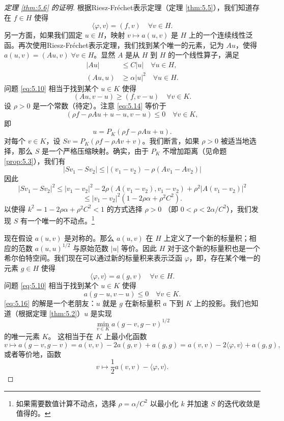 \begin{proof}[定理 \ref{thm:5.6} 的证明]
根据Riesz-Fréchet表示定理（定理 \ref{thm:5.5}），我们知道存在 $f \in H$ 使得
\[ \langle \varphi, v \rangle = (f,v) \quad \forall v \in H. \]
另一方面，如果我们固定 $u \in H$，映射 $v \mapsto a(u,v)$ 是 $H$ 上的一个连续线性泛函。再次使用Riesz-Fréchet表示定理，我们找到某个唯一的元素，记为 $Au$，使得 $a(u,v)=(Au,v) \; \forall v \in H$。显然 $A$ 是从 $H$ 到 $H$ 的一个线性算子，满足
\begin{align}
|Au| &\le C|u| \quad \forall u \in H, \label{eq:5.12} \\
(Au,u) &\ge \alpha|u|^2 \quad \forall u \in H. \label{eq:5.13}
\end{align}
问题 \eqref{eq:5.10} 相当于找到某个 $u \in K$ 使得
\begin{equation}\label{eq:5.14}
(Au, v-u) \ge (f, v-u) \quad \forall v \in K.
\end{equation}
设 $\rho > 0$ 是一个常数（待定）。注意 \eqref{eq:5.14} 等价于
\begin{equation}\label{eq:5.15}
(\rho f - \rho Au + u - u, v-u) \le 0 \quad \forall v \in K,
\end{equation}
即
\[ u = P_K(\rho f - \rho Au + u). \]
对每个 $v \in K$，设 $Sv = P_K(\rho f - \rho Av + v)$。我们断言，如果 $\rho > 0$ 被适当地选择，那么 $S$ 是一个严格压缩映射。确实，由于 $P_K$ 不增加距离（见命题 \ref{prop:5.3}），我们有
\[ |Sv_1 - Sv_2| \le |(v_1 - v_2) - \rho(Av_1 - Av_2)| \]
因此
\[ |Sv_1 - Sv_2|^2 \le |v_1-v_2|^2 - 2\rho(A(v_1-v_2), v_1-v_2) + \rho^2|A(v_1-v_2)|^2 \]
\[ \le |v_1-v_2|^2 (1-2\rho\alpha + \rho^2 C^2). \]
以使得 $k^2 = 1-2\rho\alpha + \rho^2 C^2 < 1$ 的方式选择 $\rho > 0$ （即 $0 < \rho < 2\alpha/C^2$），我们发现 $S$ 有一个唯一的不动点。\footnote{如果需要数值计算不动点，选择 $\rho = \alpha/C^2$ 以最小化 $k$ 并加速 $S$ 的迭代收敛是值得的。}

现在假设 $a(u,v)$ 是对称的。那么 $a(u,v)$ 在 $H$ 上定义了一个新的标量积；相应的范数 $a(u,u)^{1/2}$ 与原始范数 $|u|$ 等价。因此 $H$ 对于这个新的标量积也是一个希尔伯特空间。我们现在可以通过新的标量积来表示泛函 $\varphi$，即，存在某个唯一的元素 $g \in H$ 使得
\[ \langle \varphi, v \rangle = a(g,v) \quad \forall v \in H. \]
问题 \eqref{eq:5.10} 相当于找到某个 $u \in K$ 使得
\begin{equation}\label{eq:5.16}
a(g-u, v-u) \le 0 \quad \forall v \in K.
\end{equation}
\eqref{eq:5.16} 的解是一个老朋友：$u$ 就是 $g$ 在新标量积 $a$ 下到 $K$ 上的投影。我们也知道（根据定理 \ref{thm:5.2}）$u$ 是实现
\[ \min_{v \in K} a(g-v, g-v)^{1/2} \]
的唯一元素 $K$。
这相当于在 $K$ 上最小化函数
\[ v \mapsto a(g-v, g-v) = a(v,v) - 2a(g,v) + a(g,g) = a(v,v) - 2\langle\varphi, v\rangle + a(g,g), \]
或者等价地，函数
\[ v \mapsto \frac{1}{2}a(v,v) - \langle \varphi, v \rangle. \]
\end{proof}

